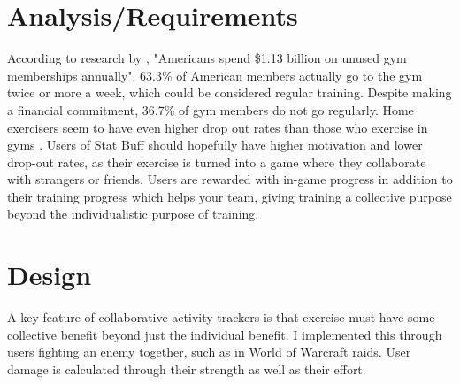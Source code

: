 \documentclass{l4proj}
\begin{document}
\chapter{Analysis/Requirements}
According to research by \citet{unused_memberships}, "Americans spend \$1.13 billion on unused gym memberships annually". 63.3\% of American members actually go to the gym twice or more a week, which could be considered regular training. Despite making a financial commitment, 36.7\% of gym members do not go regularly. Home exercisers seem to have even higher drop out rates than those who exercise in gyms \citep{home_vs_gym}. Users of Stat Buff should hopefully have higher motivation and lower drop-out rates, as their exercise is turned into a game where they collaborate with strangers or friends. Users are rewarded with in-game progress in addition to their training progress which helps your team, giving training a collective purpose beyond the individualistic purpose of training. 


\chapter{Design}

A key feature of collaborative activity trackers is that exercise must have some collective benefit beyond just the individual benefit. I implemented this through users fighting an enemy together, such as in World of Warcraft raids. User damage is calculated through their strength as well as their effort. 
\end{document}
